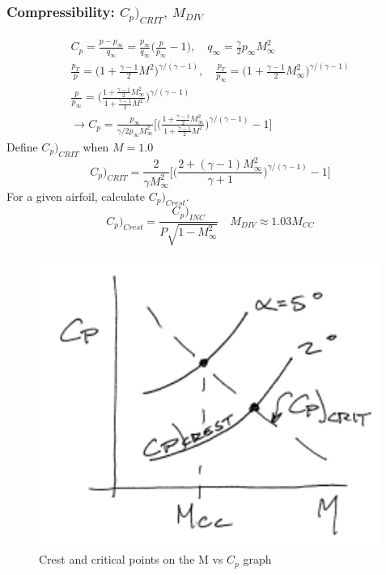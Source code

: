 \documentclass[draft=false, titlepage]{article}
\begin{document}
\subsubsection{Compressibility: $C_p\big)_{CRIT},\ M_{DIV}$}
\begin{gather*}
C_p = \frac{p-p_\infty}{q_\infty} = \frac{p_\infty}{q_\infty}\Big( \frac{p}{p_\infty} - 1 \Big),\quad q_\infty = \frac{\gamma}{2}p_\infty M_\infty^2\\
\frac{p_T}{p} = \Big( 1 + \frac{\gamma-1}{2}M^2 \Big)^{\gamma/(\gamma-1)},\quad \frac{p_T}{p_\infty} = \Big(1 + \frac{\gamma-1}{2}M_\infty^2\Big)^{\gamma/(\gamma-1)}\\
\frac{p}{p_\infty} = \Big( \frac{1+\frac{\gamma-1}{2}M_\infty^2}{1+\frac{\gamma-1}{2}M^2} \Big)^{\gamma/(\gamma-1)}\\
\rightarrow C_p = \frac{p_\infty}{\gamma/2p_\infty M_\infty^2}\Big[ \Big( \frac{1+\frac{\gamma-1}{2}M_\infty^2}{1+\frac{\gamma-1}{2}M^2} \Big)^{\gamma/(\gamma-1)}-1 \Big]
\end{gather*}
Define $C_p\Big)_{CRIT}$ when $M=1.0$
\begin{equation}
C_p\Big)_{CRIT} = \frac{2}{\gamma M_\infty^2} \Big[\Big( \frac{2+(\gamma-1)M_\infty^2}{\gamma+1} \Big)^{\gamma/(\gamma-1)}-1\Big]
\label{eq:CpCrit}
\end{equation}
For a given airfoil, calculate $C_p\big)_{Crest}$.
\begin{equation}
C_p\Big)_{Crest} = \frac{C_p\Big)_{INC}}{P\sqrt{1-M_\infty^2}} \quad M_{DIV} \approx 1.03 M_{CC}
\label{eq:CpvsMach}
\end{equation}
\begin{figure}[ht]
	\centering
	\includegraphics[width=0.4\linewidth]{Figures/p58_CpCrest.PNG}
	\caption{Crest and critical points on the M vs $C_p$ graph}
	\label{fig:p58_CpCrest}
\end{figure}
\end{document}
